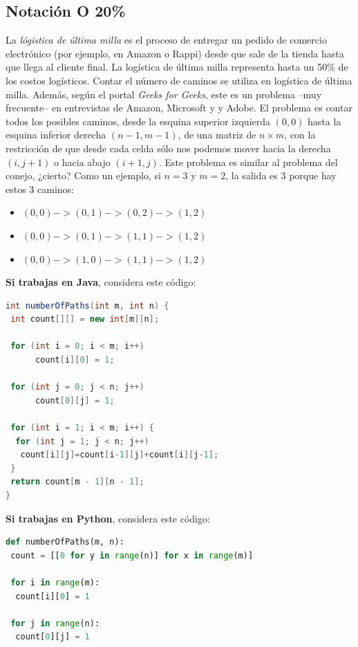 \documentclass[10 pt]{article}
\begin{document}
\begin{multicols}{2}
\section{Notación O 20\%}
La \emph{lógistica de última milla} es el proceso de entregar un pedido de comercio electrónico (por ejemplo, en Amazon o Rappi) desde que sale de la tienda hasta que llega al cliente final. La logística de última milla representa hasta un 50\% de los costos logísticos. Contar el número de caminos se utiliza en logística de última milla.  Además, según el portal \textit{Geeks for Geeks}, este es un problema --muy frecuente-- en entrevistas de Amazon, Microsoft y y Adobe. El problema es contar todos los posibles caminos, desde la esquina superior izquierda $(0,0)$ hasta la esquina inferior derecha $(n-1, m-1)$, de una matriz de $n \times m$, con la restricción de que desde cada celda sólo nos podemos mover hacia la derecha $(i,j+1)$ o hacia abajo $(i+1,j)$. Este problema es similar al problema del conejo, ¿cierto? Como un ejemplo, si $n = 3$ y $m=2$, la salida es $3$ porque hay estos $3$ caminos:
\begin{itemize}
\item $(0, 0) -> (0, 1) -> (0, 2) -> (1, 2)$
\item $(0, 0) -> (0, 1) -> (1, 1) -> (1, 2)$
\item $(0, 0) -> (1, 0) -> (1, 1) -> (1, 2)$
\end{itemize}
 

\textbf{Si trabajas en Java}, considera este código:
{\footnotesize
\begin{lstlisting}[language=Java]
int numberOfPaths(int m, int n) { 
 int count[][] = new int[m][n]; 
 
 for (int i = 0; i < m; i++) 
      count[i][0] = 1; 

 for (int j = 0; j < n; j++) 
      count[0][j] = 1; 
  
 for (int i = 1; i < m; i++) { 
  for (int j = 1; j < n; j++)   
   count[i][j]=count[i-1][j]+count[i][j-1]; 
 } 
 return count[m - 1][n - 1]; 
} 

\end{lstlisting}
}

\textbf{Si trabajas en Python}, considera este código:
{\footnotesize
\begin{lstlisting}[language=Python]
def numberOfPaths(m, n): 
 count = [[0 for y in range(n)] for x in range(m)] 

 for i in range(m): 
  count[i][0] = 1 

 for j in range(n): 
  count[0][j] = 1 


\end{lstlisting}}
\end{multicols}
\end{document}
